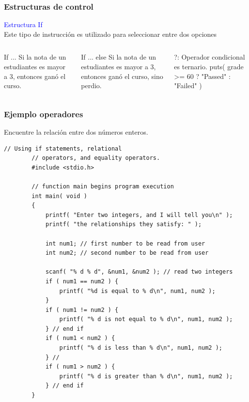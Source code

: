 \documentclass[10.5pt,scale=1.0,t,aspectratio=169,hyperref={pdfpagelabels=false}]{beamer}
\begin{document}
\begin{frame}
	\frametitle{Estructuras de control}
	\textcolor{blue}{\large Estructura If} \\
	Este tipo de instrucción es utilizado para seleccionar entre dos opciones
	
	\begin{columns}
		\begin{block}{\small If ...}
			\justifying
			Si la nota de un estudiantes es mayor a 3, entonces ganó el curso. 
		\end{block}
		
		\begin{block}{\small If ... else}
			\justifying
			Si la nota de un estudiantes es mayor a 3, entonces ganó el curso, sino perdio. 
		\end{block}
	
		\begin{block}{\small ?:}
			\justifying
			Operador condicional es ternario. 
			puts( grade >= 60 ? "Passed" : "Failed" ) 
		\end{block}
	\end{columns}
\end{frame}

\begin{frame}[fragile]
	\frametitle{Ejemplo operadores}
	
	Encuentre la relación entre dos números enteros. 
	
	\begin{lstlisting}[style=CStyle]
		// Using if statements, relational
		// operators, and equality operators.
		#include <stdio.h>
		
		// function main begins program execution
		int main( void )
		{
			printf( "Enter two integers, and I will tell you\n" );
			printf( "the relationships they satisfy: " );
			
			int num1; // first number to be read from user
			int num2; // second number to be read from user
			
			scanf( "% d % d", &num1, &num2 ); // read two integers	
			if ( num1 == num2 ) {
				printf( "%d is equal to % d\n", num1, num2 );
			}
			if ( num1 != num2 ) {
				printf( "% d is not equal to % d\n", num1, num2 );
			} // end if
			if ( num1 < num2 ) {
				printf( "% d is less than % d\n", num1, num2 );
			} //
			if ( num1 > num2 ) {
				printf( "% d is greater than % d\n", num1, num2 );
			} // end if
		}
	\end{lstlisting}
	
\end{frame}
\end{document}
